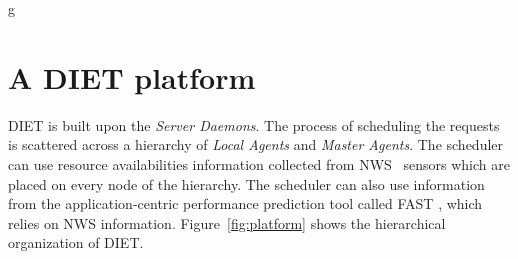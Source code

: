 g%

\chapter{A DIET platform}
\label{ch:description}

\textsc{DIET} is built upon the \emph{Server Daemons}. The process of
scheduling the requests is scattered across a hierarchy of \emph{Local
Agents} and \emph{Master Agents}. The scheduler can use resource
availabilities information collected from NWS~\cite{WSH99} sensors
which are placed on every node of the hierarchy. The scheduler can
also use information from the application-centric performance
prediction tool called \textsc{FAST} \cite{Qui02}, which relies on NWS
information. Figure~\ref{fig:platform} shows the hierarchical
organization of DIET.

